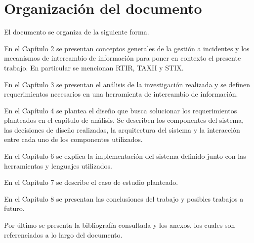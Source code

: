 \section{Organización del documento}
\label{capitulo1:organizacion}
El documento se organiza de la siguiente forma.

En el Capítulo 2 se presentan conceptos generales de la gestión a incidentes y los mecanismos de intercambio de información para poner en contexto el presente trabajo. En particular se mencionan RTIR, TAXII y STIX.

En el Capítulo 3 se presentan el análisis de la investigación realizada y se definen requerimientos necesarios en una herramienta de intercambio de información.

En el Capítulo 4 se plantea el diseño que busca solucionar los requerimientos planteados en el capítulo de análisis. Se describen los componentes del sistema, las decisiones de diseño realizadas, la arquitectura del sistema y la interacción entre cada uno de los componentes utilizados.

En el Capítulo 6 se explica la implementación del sistema definido junto con las herramientas y lenguajes utilizados.

En el Capítulo 7 se describe el caso de estudio planteado.

En el Capítulo 8 se presentan las conclusiones del trabajo y posibles trabajos a futuro.

Por último se presenta la bibliografía consultada y los anexos, los cuales son referenciados a lo largo del documento.
